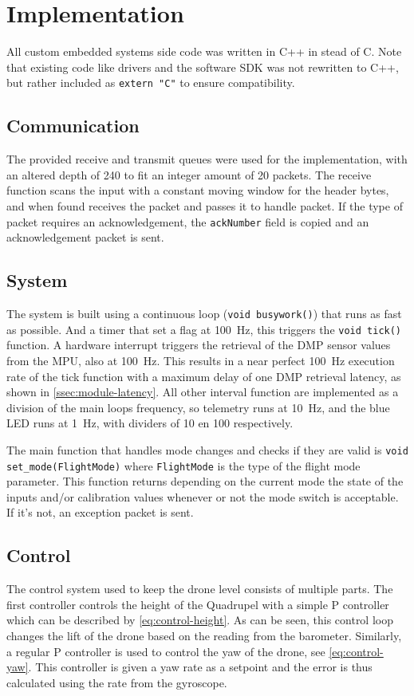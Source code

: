 \documentclass[final]{article}
\begin{document}
\section{Implementation}
\label{sec:implementation}

All custom embedded systems side code was written in C++ in stead of C.
Note that existing code like drivers and the software SDK was not rewritten to C++, but rather included as \texttt{extern "C"} to ensure compatibility.

\subsection{Communication}
The provided receive and transmit queues were used for the implementation, with an altered depth of \SI{240}{\byte} to fit an integer amount of \SI{20}{\byte} packets.
The receive function scans the input with a constant moving window for the header bytes, and when found receives the packet and passes it to handle packet.
If the type of packet requires an acknowledgement, the \texttt{ackNumber} field is copied and an acknowledgement packet is sent.

\subsection{System}
\label{ssec:implementation-system}
The system is built using a continuous loop (\texttt{void busywork()}) that runs as fast as possible.
And a timer that set a flag at \SI{100}{\hertz}, this triggers the \texttt{void tick()} function.
A hardware interrupt triggers the retrieval of the DMP sensor values from the MPU, also at \SI{100}{\hertz}.
This results in a near perfect \SI{100}{\hertz} execution rate of the tick function with a maximum delay of one DMP retrieval latency, as shown in \cref{ssec:module-latency}.
All other interval function are implemented as a division of the main loops frequency, so telemetry runs at \SI{10}{\hertz}, and the blue LED runs at \SI{1}{\hertz}, with dividers of 10 en 100 respectively.

The main function that handles mode changes and checks if they are valid is \texttt{void set\_mode(FlightMode)} where \texttt{FlightMode} is the type of the flight mode parameter.
This function returns depending on the current mode the state of the inputs and/or calibration values whenever or not the mode switch is acceptable.
If it's not, an exception packet is sent.

\subsection{Control}
The control system used to keep the drone level consists of multiple parts.
The first controller controls the height of the Quadrupel with a simple P controller which can be described by \autoref{eq:control-height}.
As can be seen, this control loop changes the lift of the drone based on the reading from the barometer.
Similarly, a regular P controller is used to control the yaw of the drone, see \autoref{eq:control-yaw}.
This controller is given a yaw rate as a setpoint and the error is thus calculated using the rate from the gyroscope.
\end{document}
